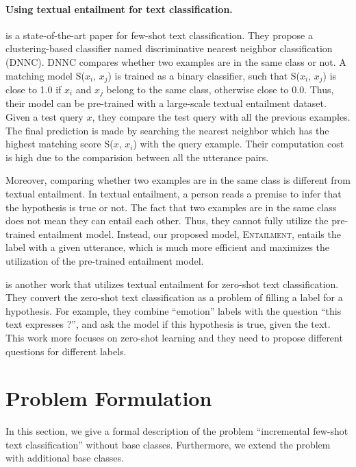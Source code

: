 \documentclass[11pt]{article}
\newcommand{\modelname}{\textsc{Entailment}}
\begin{document}
\paragraph{Using textual entailment for text classification.}
\citet{zhangdiscriminative} is a state-of-the-art paper for few-shot text classification. 
They propose a clustering-based classifier named discriminative nearest neighbor classification (DNNC). DNNC compares whether two examples are in the same class or not.
A matching model S($x_i$, $x_j$) is trained as a binary classifier, such that S($x_i$, $x_j$) is close to 1.0 if $x_i$ and $x_j$ belong to the same class, otherwise close to 0.0. Thus, their model can be pre-trained with a large-scale textual entailment dataset. Given a test query $x$, they compare the test query with all the previous examples. The final prediction is made by searching the nearest neighbor which has the highest matching score S($x$, $x_i$) with the query example. 
Their computation cost is high due to the comparision between all the utterance pairs.

Moreover, comparing whether two examples are in the same class is different from textual entailment. In textual entailment, a person reads a premise to infer that the hypothesis is true or not. The fact that two examples are in the same class does not mean they can entail each other.
Thus, they cannot fully utilize the pre-trained entailment model.
Instead, our proposed model, \modelname, entails the label with a given utterance, which is much more efficient and maximizes the utilization of the pre-trained entailment model. 

\citet{DBLPYinHR19} is another work that utilizes textual entailment for zero-shot text classification. They convert the zero-shot text classification as a problem of filling a label for a hypothesis. For example, they combine ``emotion'' labels with the question “this text expresses ?”, and ask the model if this hypothesis is true, given the text. This work more focuses on zero-shot learning and they need to propose different questions for different labels.

\section{Problem Formulation}\label{sec:probdefinitino}
In this section, we give a formal description of the problem ``incremental few-shot text classification'' without base classes. Furthermore, we extend the problem with additional base classes.
\end{document}
